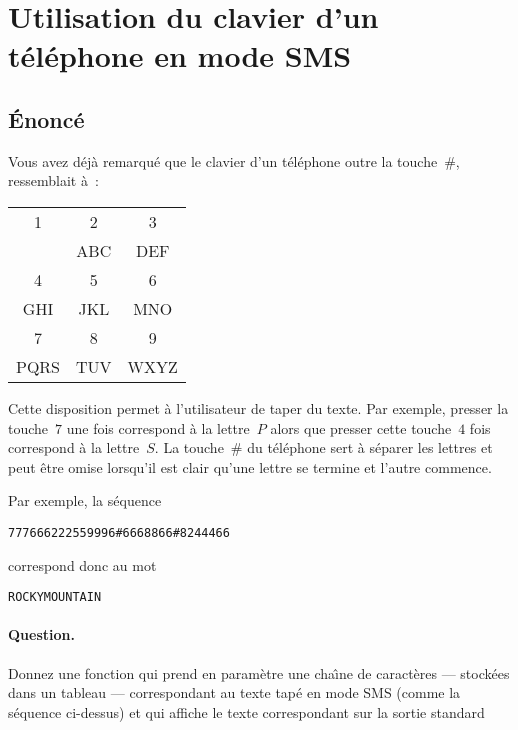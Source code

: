 \section{Utilisation du clavier d'un t\'el\'ephone en mode SMS}
\ifcorrection%
\subsection*{\'Enonc\'e}%
\fi%
Vous  avez  d\'ej\`a  remarqu\'e  que  le   clavier d'un t\'el\'ephone
outre la touche~\#, ressemblait \`a~:
\par
\begin{center}
\begin{tabular}{ccc}
 1 &  2  & 3 \\
   & ABC & DEF \\[\smallskipamount]
 4 & 5 & 6 \\
GHI & JKL & MNO  \\[\smallskipamount]
 7 & 8 & 9 \\
PQRS &TUV  &WXYZ
\end{tabular}
\end{center}
\par
Cette disposition permet   \`a l'utilisateur de taper   du texte.  Par
exemple, presser  la touche~$7$ une fois  correspond \`a la lettre~$P$
alors que presser cette touche~$4$ fois correspond  \`a la lettre~$S$. 
La touche~\#  du t\'el\'ephone sert \`a s\'eparer  les lettres et peut
\^etre  omise lorsqu'il est clair qu'une  lettre se termine et l'autre
commence.
\par
Par exemple, la s\'equence
\begin{verbatim}
777666222559996#6668866#8244466
\end{verbatim}
correspond donc au mot
\begin{verbatim}
ROCKYMOUNTAIN
\end{verbatim}
\paragraph{Question.}
Donnez une fonction qui prend en param\`etre une cha\^\i{}ne de
caract\`eres --- stock\'ees dans un tableau --- correspondant au texte
tap\'e en mode SMS (comme la s\'equence ci-dessus) et qui affiche le texte 
 correspondant sur la sortie standard
